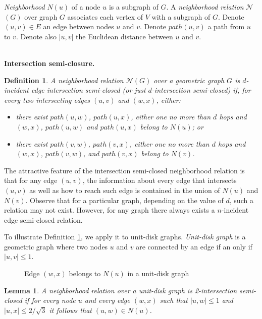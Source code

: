 \documentclass[conference]{IEEEtran}
\newtheorem{definition}{Definition}
\newtheorem{lemma}{Lemma}
\def\PROG#1{$\mathcal{#1}$}
\begin{document}
\emph{Neighborhood} $N(u)$ of a node $u$ is a subgraph of $G$. A
\emph{neighborhood relation} \PROG{N}$(G)$ over graph $G$ associates
each vertex of $V$ with a subgraph of $G$.  Denote $(u,v) \in E$ an
edge between nodes $u$ and $v$. Denote $path(u,v)$ a path from $u$ to
$v$. Denote also $|u,v|$ the Euclidean distance between $u$ and $v$.




\ \\ \noindent
\textbf{Intersection semi-closure.}

\begin{definition} \label{DefSemiclosure}
A neighborhood relation \PROG{N}$(G)$ over a geometric graph $G$ is
\emph{$d$-incident edge intersection semi-closed} (or just
\emph{$d$-intersection semi-closed}) if, for every two intersecting
edges $(u,v)$ and $(w,x)$, either:
\begin{itemize}
\item there exist $path(u,w)$, $path(u,x)$, either one no more than
$d$ hops and $(w,x)$, $path(u,w)$ and $path(u,x)$ belong to $N(u)$; or
\item there exist $path(v,w)$, $path(v,x)$, either one no more than
$d$ hops and $(w,x)$, $path(v,w)$, and $path(v,x)$ belong to $N(v)$.
\end{itemize}

\end{definition}

The attractive feature of the intersection semi-closed neighborhood
relation is that for any edge $(u,v)$, the information about every
edge that intersects $(u,v)$ as well as how to reach such edge is
contained in the union of $N(u)$ and $N(v)$. Observe that for a
particular graph, depending on the value of $d$, such a relation
may not exist. However, for any graph there always exists
a $n$-incident edge semi-closed relation.

To illustrate Definition \ref{DefSemiclosure}, we apply it to
unit-disk graphs.  \emph{Unit-disk graph} is a geometric graph where
two nodes $u$ and $v$ are connected by an edge if an only if $|u,v|
\leq 1$.

\begin{figure} 
\center
{} 
\caption{Edge $(w,x)$ belongs to $N(u)$ in a unit-disk graph}
\label{FigUdisk} 
\end{figure}

\begin{lemma}\label{UDiskNeighborhood}
A neighborhood relation over a unit-disk graph is 2-intersection
semi-closed if for every node $u$ and every edge $(w,x)$ such that
$|u,w| \leq 1$ and $|u,x| \leq 2/\sqrt{3}$ it follows that $(u,w) \in
N(u)$.
\end{lemma}
\end{document}
